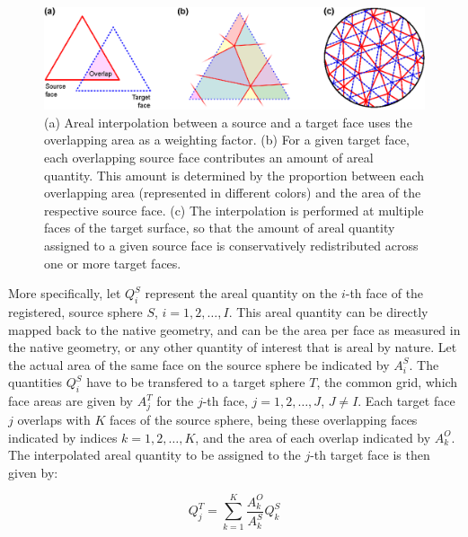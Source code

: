 \begin{figure}[!t]  %
\centering
\includegraphics[width=14cm]{images/triangles.eps}
\caption[Overlapping areas used to weight areal quantities during interpolation.]{(a) Areal interpolation between a source and a target face uses the overlapping area as a weighting factor. (b) For a given target face, each overlapping source face contributes an amount of areal quantity. This amount is determined by the proportion between each overlapping area (represented in different colors) and the area of the respective source face. (c) The interpolation is performed at multiple faces of the target surface, so that the amount of areal quantity assigned to a given source face is conservatively redistributed across one or more target faces.}
\label{fig:triangles}
\end{figure}

More specifically, let $Q^{S}_{i}$ represent the areal quantity on the $i$-th face of the registered, source sphere $S$, $i=1,2,\ldots,I$. This areal quantity can be directly mapped back to the native geometry, and can be the area per face as measured in the native geometry, or any other quantity of interest that is areal by nature. Let the actual area of the same face on the source sphere be indicated by $A^{S}_{i}$. The quantities $Q^{S}_{i}$ have to be transfered to a target sphere $T$, the common grid, which face areas are given by $A^{T}_{j}$ for the $j$-th face, $j=1,2,\ldots,J$, $J \neq I$. Each target face $j$ overlaps with $K$ faces of the source sphere, being these overlapping faces indicated by indices $k=1,2,\ldots,K$, and the area of each overlap indicated by $A^{O}_{k}$. The interpolated areal quantity to be assigned to the $j$-th target face is then given by:

\begin{equation}
Q^{T}_{j} = \sum_{k=1}^{K} \frac{A^{O}_{k}}{A^{S}_{k}} Q^{S}_{k}
\end{equation}

